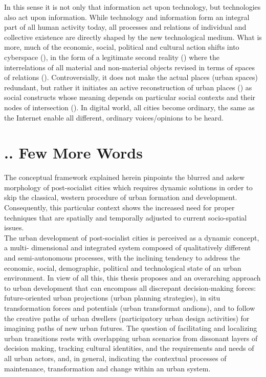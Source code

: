 \documentclass[11pt]{report}
\begin{document}
{In this sense it is not only that information act upon technology, but technologies also act upon information.
While technology and information form an integral part of all human activity today, all processes and relations of individual and collective existence are directly shaped by the new technological medium.
What is more, much of the economic, social, political and cultural action shifts into cyberspace (\href{Mitchell}{\citealt{mitchell_city_1996}}), in the form of a legitimate second reality (\href{Baudrillard}{\citealt{baudrillard_l_1983}}) where the interrelations of  all material and non-material objects revised in terms of spaces of relations (\href{Graham}{\citealt{graham_relational_1999}}).
Controversially, it does not make the actual places (urban spaces) redundant, but rather it initiates an active reconstruction of urban places (\href{ref}{\citealt{graham_splintering_2001}}) as social constructs whose meaning depends on particular social contexts and their nodes of intersection (\href{ref}{\citealt{healey_treatment_2004}}).
In digital world, all cities become ordinary, the same as the Internet enable all different, ordinary voices/opinions to be heard.

\section{.. Few More Words}

The conceptual framework explained herein pinpoints the blurred and askew morphology of post-socialist cities which requires dynamic solutions in order to skip the classical, western procedure of urban formation and development. Consequently, this particular context shows the increased need for proper techniques that are spatially and temporally adjusted to current socio-spatial issues. 
\\

The urban development of post-socialist cities is perceived as a dynamic concept, a multi- dimensional and integrated system composed of qualitatively different and semi-autonomous processes, with the inclining tendency to address the economic, social, demographic, political and technological state of an urban environment.  In view of all this, this thesis proposes and an overarching approach to urban development that can encompass all discrepant decision-making forces: future-oriented urban projections (urban planning strategies), in situ transformation forces and potentials (urban transformat andions), and to follow the creative paths of urban dwellers (participatory urban design activities) for imagining paths of new urban futures.
The question of facilitating and localizing urban transitions rests with overlapping urban scenarios from dissonant layers of decision making, tracking cultural identities, and the requirements and needs of all urban actors, and, in general, indicating the contextual processes of maintenance, transformation and change within an urban system.

}
\end{document}

